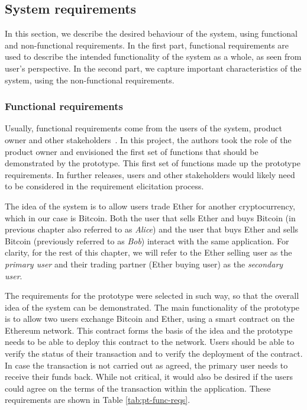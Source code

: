 \subsection{System requirements}\label{sec:system-reqs}

In this section, we describe the desired behaviour of the system, using functional and non-functional requirements. In the first part, functional requirements are used to describe the intended functionality of the system as a whole, as seen from user's perspective. In the second part, we capture important characteristics of the system, using the non-functional requirements.

\subsubsection{Functional requirements}
Usually, functional requirements come from the users of the system, product owner and other stakeholders~\cite{Sommerville2011SoftwareEngineering}. In this project, the authors took the role of the product owner and envisioned the first set of functions that should be demonstrated by the prototype. This first set of functions made up the prototype requirements. In further releases, users and other stakeholders would likely need to be considered in the requirement elicitation process.


The idea of the system is to allow users trade Ether for another cryptocurrency, which in our case is Bitcoin. Both the user that sells Ether and buys Bitcoin (in previous chapter also referred to as \textit{Alice}) and the user that buys Ether and sells Bitcoin (previously referred to as \textit{Bob}) interact with the same application. For clarity, for the rest of this chapter, we will refer to the Ether selling user as the \textit{primary user} and their trading partner (Ether buying user) as the \textit{secondary user}.

The requirements for the prototype were selected in such way, so that the overall idea of the system can be demonstrated. The main functionality of the prototype is to allow two users exchange Bitcoin and Ether, using a smart contract on the Ethereum network. This contract forms the basis of the idea and the prototype needs to be able to deploy this contract to the network. Users should be able to verify the status of their transaction and to verify the deployment of the contract. In case the transaction is not carried out as agreed, the primary user needs to receive their funds back. While not critical, it would also be desired if the users could agree on the terms of the transaction within the application. These requirements are shown in Table \ref{tab:pt-func-reqs}. 

